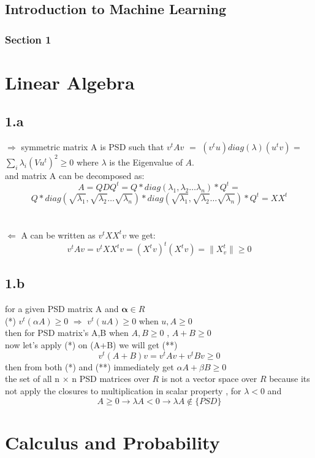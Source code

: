 \documentclass[12pt]{article}
\begin{document}
\begin{center}
\section*{Introduction to Machine Learning}
\subsubsection*{Section 1}
\end{center}
\section*{Linear Algebra}
\subsection*{1.a}
$\Rightarrow$ 
symmetric matrix A is PSD such that ${v^tAv}$ $=$ ${(v^tu) diag (\lambda)(u^tv)}$  = \\
${\sum_{i}\lambda_i(Vu^t)^2\geq0}$ where $\lambda$ is the Eigenvalue of $A$. \\and matrix A can be decomposed as: \[A = 
 QDQ^t = Q*diag(\lambda_1,\lambda_2\ldots\lambda_n)*Q^t =\]  \[Q*diag(\sqrt{\lambda_1},\sqrt{\lambda_2}\ldots\sqrt{\lambda_n})*diag(\sqrt{\lambda_1},\sqrt{\lambda_2}\ldots\sqrt{\lambda_n})*Q^t= XX^t\]
\\\\
$\Leftarrow$ A can be written as $v^tXX^tv$ we get: \[ v^tAv=v^tXX^tv=(X^tv)^t(X^tv)=\parallel X^t_v \parallel \geq 0\]
\subsection*{1.b}
for a given PSD matrix A and $\mathbf \alpha\in{R}$    \\
(*) $v^t(\alpha A)\geq 0$ $\Rightarrow$ $v^t(u A)\geq 0$ when $u , A \geq 0$
\\then for  PSD matrix's A,B  when $A,B \geq 0$ , $A+B \geq 0$\\
now let's apply (*) on (A+B) we will get (**)
\[v^t(A+B)v=v^tAv+v^tBv \geq 0\]
then from both (*) and (**) immediately get $\alpha A+\beta B\geq 0$
\\
 the set of all n × n PSD matrices over ${R}$ is not a vector space over $R$ because its not apply the closures to multiplication in scalar property , for $\lambda < 0$ and 
 \[ A\geq 0 \rightarrow  \lambda A < 0 \rightarrow \lambda A \notin \lbrace PSD \rbrace \]
 
\section*{Calculus and Probability}
\end{document}
